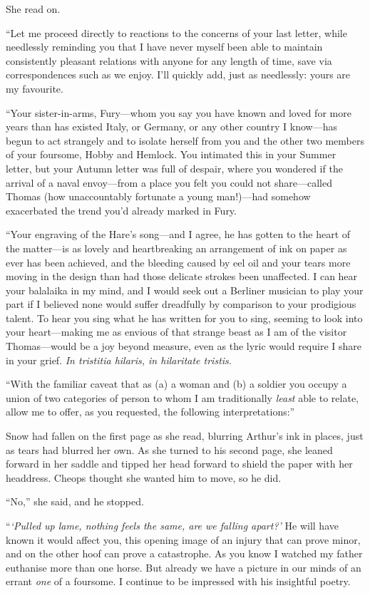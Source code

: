 \documentclass[11pt,a5paper]{article}
\begin{document}
She read on.

``Let me proceed directly to reactions to the concerns of your last letter, while needlessly reminding you that I have never myself been able to maintain consistently pleasant relations with anyone for any length of time, save via correspondences such as we enjoy. I'll quickly add, just as needlessly: yours are my favourite.

``Your sister-in-arms, Fury---whom you say you have known and loved for more years than has existed Italy, or Germany, or any other country I know---has begun to act strangely and to isolate herself from you and the other two members of your foursome, Hobby and Hemlock. You intimated this in your Summer letter, but your Autumn letter was full of despair, where you wondered if the arrival of a naval envoy---from a place you felt you could not share---called Thomas (how unaccountably fortunate a young man!)---had somehow exacerbated the trend you'd already marked in Fury.

``Your engraving of the Hare's song---and I agree, he has gotten to the heart of the matter---is as lovely and heartbreaking an arrangement of ink on paper as ever has been achieved, and the bleeding caused by eel oil and your tears more moving in the design than had those delicate strokes been unaffected. I can hear your balalaika in my mind, and I would seek out a Berliner musician to play your part if I believed none would suffer dreadfully by comparison to your prodigious talent. To hear you sing what he has written for you to sing, seeming to look into your heart---making me as envious of that strange beast as I am of the visitor Thomas---would be a joy beyond measure, even as the lyric would require I share in your grief. \emph{In tristitia hilaris, in hilaritate tristis.}

``With the familiar caveat that as (a) a woman and (b) a soldier you occupy a union of two categories of person to whom I am traditionally \emph{least} able to relate, allow me to offer, as you requested, the following interpretations:''

Snow had fallen on the first page as she read, blurring Arthur's ink in places, just as tears had blurred her own. As she turned to his second page, she leaned forward in her saddle and tipped her head forward to shield the paper with her headdress. Cheops thought she wanted him to move, so he did.

``No,'' she said, and he stopped.

``\emph{`Pulled up lame, nothing feels the same, are we falling apart?'} He will have known it would affect you, this opening image of an injury that can prove minor, and on the other hoof can prove a catastrophe. As you know I watched my father euthanise more than one horse. But already we have a picture in our minds of an errant \emph{one} of a foursome. I continue to be impressed with his insightful poetry.
\end{document}
